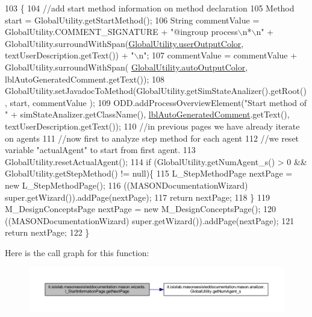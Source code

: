 \begin{DoxyCode}
103                                     \{ 
104         \textcolor{comment}{//add start method information on method declaration}
105         Method start = GlobalUtility.getStartMethod();
106         String commentValue = GlobalUtility.COMMENT\_SIGNATURE +  \textcolor{stringliteral}{"@ingroup process\(\backslash\)n*\(\backslash\)n"} + 
      GlobalUtility.surroundWithSpan(\hyperlink{classit_1_1isislab_1_1masonassisteddocumentation_1_1mason_1_1analizer_1_1_global_utility_a0fcb324ae33eb93bd5b9177e342ecc82}{GlobalUtility.userOutputColor}, textUserDescription.getText()) + \textcolor{stringliteral}{
      "\(\backslash\)n"};
107         commentValue = commentValue + GlobalUtility.surroundWithSpan(
      \hyperlink{classit_1_1isislab_1_1masonassisteddocumentation_1_1mason_1_1analizer_1_1_global_utility_a2e086c8a2d8edf16b2eaf90408832adc}{GlobalUtility.autoOutputColor}, lblAutoGeneratedComment.getText());
108         GlobalUtility.setJavadocToMethod(GlobalUtility.getSimStateAnalizer().getRoot(), start, commentValue
      );
109         ODD.addProcessOverviewElement(\textcolor{stringliteral}{"Start method of "} + simStateAnalizer.getClassName(), 
      \hyperlink{classit_1_1isislab_1_1masonassisteddocumentation_1_1mason_1_1wizards_1_1_i___start_information_page_aca7f53a1faffbca69e3509af27117c2f}{lblAutoGeneratedComment}.getText(), textUserDescription.getText());
110         \textcolor{comment}{//in previous pages we have already iterate on agents}
111         \textcolor{comment}{//now first to analyze step method for each agent}
112         \textcolor{comment}{//we reset variable "actualAgent" to start from first agent.}
113         GlobalUtility.resetActualAgent();
114         \textcolor{keywordflow}{if} (GlobalUtility.getNumAgent\_s() > 0 && GlobalUtility.getStepMethod() != null)\{
115             L\_StepMethodPage nextPage = \textcolor{keyword}{new} L\_StepMethodPage();
116             ((MASONDocumentationWizard) super.getWizard()).addPage(nextPage);
117             \textcolor{keywordflow}{return} nextPage;
118         \}
119         M\_DesignConceptsPage nextPage = \textcolor{keyword}{new} M\_DesignConceptsPage();
120         ((MASONDocumentationWizard) super.getWizard()).addPage(nextPage);
121         \textcolor{keywordflow}{return} nextPage;
122     \}
\end{DoxyCode}


Here is the call graph for this function\-:
\nopagebreak
\begin{figure}[H]
\begin{center}
\leavevmode
\includegraphics[width=350pt]{classit_1_1isislab_1_1masonassisteddocumentation_1_1mason_1_1wizards_1_1_i___start_information_page_a8323956a74dd2d72499c515fa1fc04f7_cgraph}
\end{center}
\end{figure}


